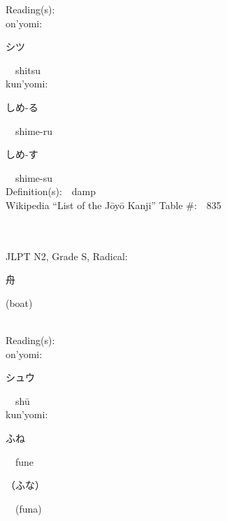 \begin{multicols}{2}
Reading(s):\ \ \\
{\hspace*{1em}}on'yomi:\ \ \\
{\hspace*{2em}}{\begin{CJK}{UTF8}{min} シツ \end{CJK}}\ \ shitsu\ \ \\
{\hspace*{1em}}kun'yomi:\ \ \\
{\hspace*{2em}}{\begin{CJK}{UTF8}{min} しめ-る \end{CJK}}\ \ shime-ru\ \ \\
{\hspace*{2em}}{\begin{CJK}{UTF8}{min} しめ-す \end{CJK}}\ \ shime-su\ \ \\
Definition(s):\ \ damp \\
Wikipedia ``List of the J\=oy\=o Kanji'' Table \#:\ \ 835 \\
\ \ \\
{\fontsize{34pt}{40pt}  }\ \ \\  %
{JLPT N2, Grade S, Radical:\ \ {\begin{CJK}{UTF8}{min} 舟 \end{CJK}} (boat) } \\
Reading(s):\ \ \\
{\hspace*{1em}}on'yomi:\ \ \\
{\hspace*{2em}}{\begin{CJK}{UTF8}{min} シュウ \end{CJK}}\ \ sh\=u\ \ \\
{\hspace*{1em}}kun'yomi:\ \ \\
{\hspace*{2em}}{\begin{CJK}{UTF8}{min} ふね \end{CJK}}\ \ fune\ \ \\
{\hspace*{2em}}{\begin{CJK}{UTF8}{min} （ふな） \end{CJK}}\ \ (funa)\ \ \\

\end{multicols}
